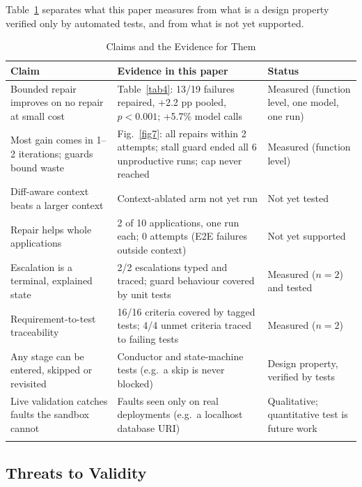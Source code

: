 \documentclass[pdflatex,sn-mathphys-num]{sn-jnl}%
\theoremstyle{thmstyleone}%
\theoremstyle{thmstyletwo}%
\theoremstyle{thmstylethree}%
\begin{document}
Table~\ref{tab7} separates what this paper measures from what is a design property verified only by automated tests, and from what is not yet supported.

\begin{table}[t]
\caption{Claims and the Evidence for Them}\label{tab7}%
\small
\begin{tabular*}{\textwidth}{@{\extracolsep\fill}p{3.3cm}p{5.0cm}p{3.4cm}@{}}
\toprule
\raggedright{}\textbf{Claim} & \raggedright{}\textbf{Evidence in this paper} & \raggedright{}\textbf{Status}\tabularnewline
\midrule
\raggedright{}Bounded repair improves on no repair at small cost & \raggedright{}Table~\ref{tab4}: 13/19 failures repaired, +2.2 pp pooled, $p < 0.001$; +5.7\% model calls & \raggedright{}Measured (function level, one model, one run)\tabularnewline
\raggedright{}Most gain comes in 1--2 iterations; guards bound waste & \raggedright{}Fig.~\ref{fig7}: all repairs within 2 attempts; stall guard ended all 6 unproductive runs; cap never reached & \raggedright{}Measured (function level)\tabularnewline
\raggedright{}Diff-aware context beats a larger context & \raggedright{}Context-ablated arm not yet run & \raggedright{}Not yet tested\tabularnewline
\raggedright{}Repair helps whole applications & \raggedright{}2 of 10 applications, one run each; 0 attempts (E2E failures outside context) & \raggedright{}Not yet supported\tabularnewline
\raggedright{}Escalation is a terminal, explained state & \raggedright{}2/2 escalations typed and traced; guard behaviour covered by unit tests & \raggedright{}Measured ($n = 2$) and tested\tabularnewline
\raggedright{}Requirement-to-test traceability & \raggedright{}16/16 criteria covered by tagged tests; 4/4 unmet criteria traced to failing tests & \raggedright{}Measured ($n = 2$)\tabularnewline
\raggedright{}Any stage can be entered, skipped or revisited & \raggedright{}Conductor and state-machine tests (e.g.\ a skip is never blocked) & \raggedright{}Design property, verified by tests\tabularnewline
\raggedright{}Live validation catches faults the sandbox cannot & \raggedright{}Faults seen only on real deployments (e.g.\ a localhost database URI) & \raggedright{}Qualitative; quantitative test is future work\tabularnewline
\botrule
\end{tabular*}
\end{table}

\subsection{Threats to Validity}\label{sec9.3}
\end{document}
